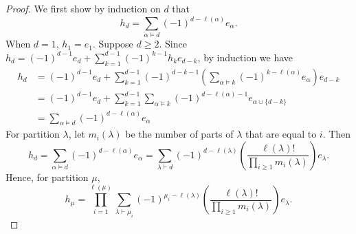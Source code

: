 \documentclass{article}
\begin{document}
\begin{proof}
  We first show by induction on $d$ that
  \[
    h_d = \sum_{\alpha \vDash d} (-1)^{d - \ell(\alpha)} e_{\alpha}.
  \]
  When $d = 1$, $h_1 = e_1$. Suppose $d \geq 2$. Since $h_d = (-1)^{d - 1}e_d + \sum_{k = 1}^{d - 1} (-1)^{k - 1}h_{k}e_{d - k}$, by induction we have
  \begin{align*}
    h_d 
    &= (-1)^{d - 1}e_d + \sum_{k = 1}^{d - 1} (-1)^{d - k - 1}\left(\sum_{\alpha \vDash k} (-1)^{k - \ell(\alpha)} e_{\alpha}\right)e_{d - k} \\
    &= (-1)^{d - 1}e_d + \sum_{k = 1}^{d - 1} \sum_{\alpha \vDash k} (-1)^{d - \ell(\alpha) - 1} e_{\alpha \cup \{d - k\}} \\
    &= \sum_{\alpha \vDash d} (-1)^{d - \ell(\alpha)} e_{\alpha}
  \end{align*}
  For partition $\lambda$, let $m_i(\lambda)$ be the number of parts of $\lambda$ that are equal to $i$. Then
  \[
    h_d = \sum_{\alpha \vDash d} (-1)^{d - \ell(\alpha)} e_{\alpha} = \sum_{\lambda \vdash d} (-1)^{d - \ell(\lambda)} \left(\frac{\ell(\lambda)!}{\prod_{i \geq 1} m_i(\lambda)}\right) e_\lambda.
  \]
  Hence, for partition $\mu$,
  \[
    h_\mu = \prod_{i = 1}^{\ell(\mu)} \sum_{\lambda \vdash \mu_i} (-1)^{\mu_i - \ell(\lambda)} \left(\frac{\ell(\lambda)!}{\prod_{i \geq 1} m_i(\lambda)}\right) e_\lambda. 
  \]
\end{proof}

\newpage
\end{document}
